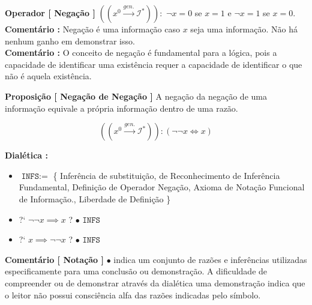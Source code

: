 \documentclass[10pt,a4paper]{report}
\begin{document}
\hspace{\baselineskip}

\textbf{Operador [ Negação ]} $((x^0 \overset{gen.}{\rightarrow} \mathcal{I}^* )) :$ $\neg x = 0$ se $x = 1$ e $\neg x = 1$ se $x=0$.\\

\textbf{Comentário :} Negação é uma informação caso $x$ seja uma informação. Não há nenhum ganho em demonstrar isso.\\

\textbf{Comentário :} O conceito de negação é fundamental para a lógica, pois a capacidade de identificar uma existência requer a capacidade de identificar o que não é aquela existência.

\hspace{\baselineskip}

\textbf{Proposição [ Negação de Negação ]} A negação da negação de uma informação equivale a própria informação dentro de uma razão.

$$ (( x^0 \overset{gen.}{\rightarrow} \mathcal{I}^*  )) : ( \neg \neg x \iff x )$$

\textbf{Dialética :}

\begin{itemize}
	\item[ ] $\texttt{INFS}:=$ \{ Inferência de substituição, de Reconhecimento de Inferência Fundamental, Definição de Operador Negação, Axioma de Notação Funcional de Informação., Liberdade de Definição \}
	\item[ ]  ?` $ \neg \neg x \implies x $ ? $\bullet$ $\texttt{INFS}$ 
	\item[ ] ?` $ x \implies \neg \neg x $ ? $\bullet$ $\texttt{INFS}$
\end{itemize}

\textbf{Comentário [ Notação ]} $\bullet$ indica um conjunto de razões e inferências utilizadas especificamente para uma conclusão ou demonstração. A dificuldade de compreender ou de demonstrar através da dialética uma demonstração indica que o leitor não possui consciência alfa das razões indicadas pelo símbolo.

\hspace{\baselineskip}
\end{document}
